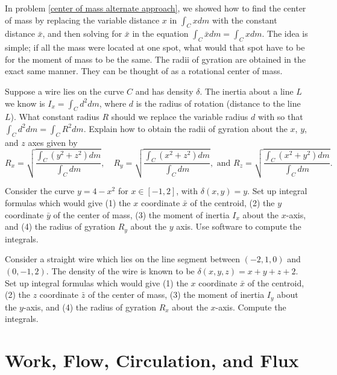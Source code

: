  In problem \ref{center of mass alternate approach}, we showed how to find the center of mass by replacing the variable distance $x$ in $\int_C x dm$ with the constant distance $\bar x$, and then solving for $\bar x$ in the equation $\int_C \bar xdm = \int_C x dm$. The idea is simple; if all the mass were located at one spot, what would that spot have to be for the moment of mass to be the same.  The radii of gyration are obtained in the exact same manner.  They can be thought of as a rotational center of mass.
\begin{problem}%
%
Suppose a wire lies on the curve $C$ and has density $\delta$. The inertia about a line $L$ we know is $I_x=\int_C d^2 dm$, where $d$ is the radius of rotation (distance to the line $L$).  What constant radius $R$ should we replace the variable radius $d$ with so that $\int_C d^2 dm = \int_C R^2 dm$.  Explain how to obtain the radii of gyration about the $x$, $y$, and $z$ axes given by 
$$
R_x = \sqrt{\frac{\int_C (y^2+z^2)dm}{\int_C dm}},\quad
R_y = \sqrt{\frac{\int_C (x^2+z^2)dm}{\int_C dm}},
\text{ and }
R_z = \sqrt{\frac{\int_C (x^2+y^2)dm}{\int_C dm}}.
$$
\end{problem}

\begin{problem}
Consider the curve $y=4-x^2$ for $x\in[-1,2]$, with $\delta (x,y) = y$.  Set up integral formulas which would give (1) the $x$ coordinate $\bar x$ of the centroid, (2) the $y$ coordinate $\bar y$ of the center of mass, (3) the moment of inertia $I_x$ about the $x$-axis, and (4) the radius of gyration $R_y$ about the $y$ axis. Use software to compute the integrals.
\end{problem}

\begin{problem}
 Consider a straight wire which lies on the line segment between $(-2,1,0)$ and $(0,-1,2)$. The density of the wire is known to be $\delta(x,y,z) = x+y+z+2$. Set up integral formulas which would give (1) the $x$ coordinate $\bar x$ of the centroid, (2) the $z$ coordinate $\bar z$ of the center of mass, (3) the moment of inertia $I_y$ about the $y$-axis, and (4) the radius of gyration $R_x$ about the $x$-axis. Compute the integrals.
\end{problem}




\section{Work, Flow, Circulation, and Flux}

